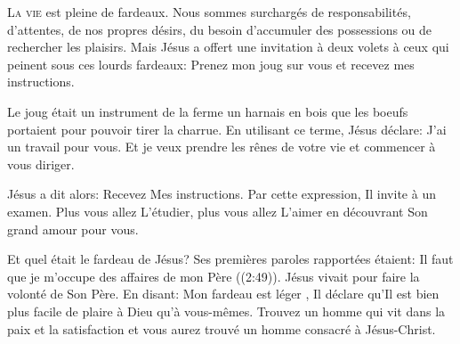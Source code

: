 

\lettrine{L}{a vie} est pleine de fardeaux.
 Nous sommes surchargés de responsabilités, d'attentes,
 de nos propres désirs, du besoin d'accumuler des possessions
 ou de rechercher les plaisirs.
 Mais Jésus a offert une invitation à deux volets à ceux
 qui peinent sous ces lourds fardeaux:
 \Og Prenez mon joug sur vous et recevez mes instructions. \Fg{}

Le joug était un instrument de la ferme \ocadr un harnais en bois
 que les boeufs portaient pour pouvoir tirer la charrue.
 En utilisant ce terme, Jésus déclare: 
 \Og J'ai un travail pour vous. Et je veux prendre les rênes
 de votre vie et commencer à vous diriger. \Fg{}


Jésus a dit alors:  \Og Recevez Mes instructions. \Fg{}
 Par cette expression, Il invite à un examen. Plus vous allez L'étudier,
 plus vous allez L'aimer en découvrant Son grand amour pour vous. 

Et quel était le fardeau de Jésus? Ses premières paroles rapportées
 étaient:  \Og Il faut que je m'occupe
 des affaires de mon Père \Fg{} ((2:49)).
 Jésus vivait pour faire la volonté de Son Père. En disant: 
 \Og Mon fardeau est léger \Fg{}, Il déclare qu'Il est bien plus facile
 de plaire à Dieu qu'à vous-mêmes.
 Trouvez un homme qui vit dans la paix et la satisfaction
 et vous aurez trouvé un homme consacré à Jésus-Christ. 

\dvrule




